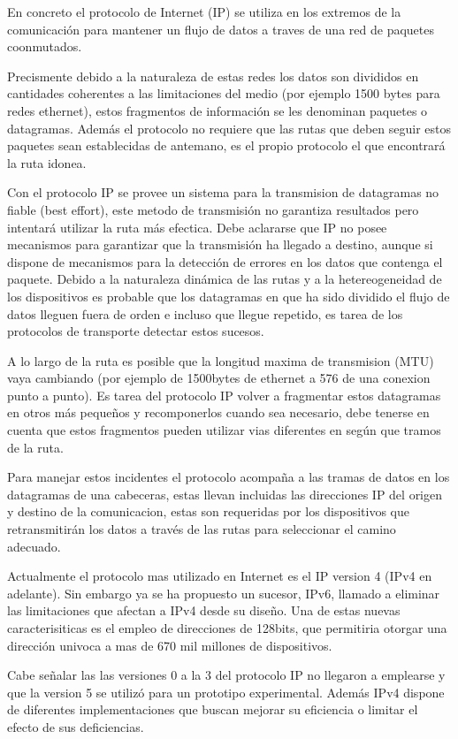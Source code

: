 \documentclass[a4paper,spanish,12pt]{book}
\begin{document}
En concreto el protocolo de Internet (IP) se utiliza en los extremos de la comunicación para mantener un flujo de datos a traves de una red de paquetes coonmutados.

Precismente debido a la naturaleza de estas redes los datos son divididos en cantidades coherentes a las limitaciones del medio (por ejemplo 1500 bytes para redes ethernet), estos fragmentos de información se les denominan paquetes o datagramas. Además el protocolo no requiere que las rutas que deben seguir estos paquetes sean establecidas de antemano, es el propio protocolo el que encontrará la ruta idonea.

Con el protocolo IP se provee un sistema para la transmision de datagramas no fiable (best effort), este metodo de transmisión no garantiza resultados pero intentará utilizar la ruta más efectica. Debe aclararse que IP no posee mecanismos para garantizar que la transmisión ha llegado a destino, aunque si dispone de mecanismos para la detección de errores en los datos que contenga el paquete. Debido a la naturaleza dinámica de las rutas y a la hetereogeneidad de los dispositivos es probable que los datagramas en que ha sido dividido el flujo de datos lleguen fuera de orden e incluso que llegue repetido, es tarea de los protocolos de transporte detectar estos sucesos.

A lo largo de la ruta es posible que la longitud maxima de transmision (MTU) vaya cambiando (por ejemplo de 1500bytes de ethernet a 576 de una conexion punto a punto). Es tarea del protocolo IP volver a fragmentar estos datagramas en otros más pequeños y recomponerlos cuando sea necesario, debe tenerse en cuenta que estos fragmentos pueden utilizar vias diferentes en según que tramos de la ruta.

Para manejar estos incidentes el protocolo acompaña a las tramas de datos en los datagramas de una cabeceras, estas llevan incluidas las direcciones IP del origen y destino de la comunicacion, estas son requeridas por los dispositivos que retransmitirán los datos a trav\'es de las rutas para seleccionar el camino adecuado.

Actualmente el protocolo mas utilizado en Internet es el IP version 4 (IPv4 en adelante). Sin embargo ya se ha propuesto un sucesor, IPv6, llamado a eliminar las limitaciones que afectan a IPv4 desde su diseño. Una de estas nuevas caracterisiticas es el empleo de direcciones de 128bits, que permitiria otorgar una dirección univoca a mas de 670 mil millones de dispositivos. 

Cabe señalar las las versiones 0 a la 3 del protocolo IP no llegaron a emplearse  y que la version 5 se utilizó para un prototipo experimental. Además IPv4 dispone de diferentes implementaciones que buscan mejorar su eficiencia o limitar el efecto de sus deficiencias.
\end{document}
